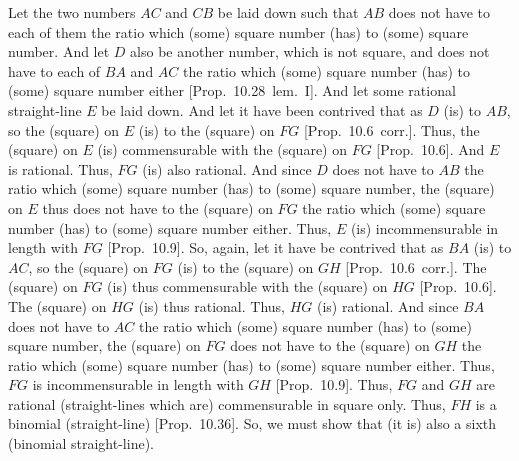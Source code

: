 \begin{Parallel}{}{}
{Let the two numbers $AC$ and $CB$ be laid down such that $AB$ does
not have to each of them the ratio which (some) square number (has) to (some) square number.  And let $D$  also be another number, which is not
square, and does not have to each of $BA$ and $AC$ the ratio which (some)
square number (has) to (some) square number either [Prop.~10.28~lem.~I]. And let some rational straight-line $E$ be laid down. And let it have been contrived that as $D$ (is) to
$AB$, so the (square) on $E$ (is) to the (square) on $FG$ [Prop.~10.6~corr.].  Thus, the (square) on $E$
(is) commensurable with the (square) on $FG$ [Prop.~10.6]. And $E$ is rational. Thus, $FG$
(is) also rational.  And since $D$ does not have to $AB$ the ratio
which (some) square number (has) to (some) square number, the (square) on $E$ thus does not have to the (square) on $FG$ the ratio which (some) square number (has) to (some) square number either. Thus, $E$ (is) incommensurable in length with $FG$ [Prop.~10.9].
So, again, let it have be contrived that as $BA$ (is) to $AC$, so the (square)
on $FG$ (is) to the (square) on $GH$ [Prop.~10.6~corr.]. The (square) on $FG$ (is)
thus commensurable with the (square) on $HG$ [Prop.~10.6].
 The (square) on $HG$ (is) thus rational.  Thus, $HG$ (is) rational. And since $BA$ does not have to
$AC$ the ratio which (some) square number (has) to (some) square number,
the (square) on $FG$ does not have to the (square) on $GH$ the
ratio which (some) square number (has) to (some) square number either.
Thus, $FG$ is incommensurable in length with $GH$ [Prop.~10.9]. Thus, $FG$ and $GH$ are rational (straight-lines which are) commensurable in square only. Thus, $FH$
is a binomial (straight-line) [Prop.~10.36]. So,
we must show that (it is) also a sixth (binomial straight-line).

}
\end{Parallel}

